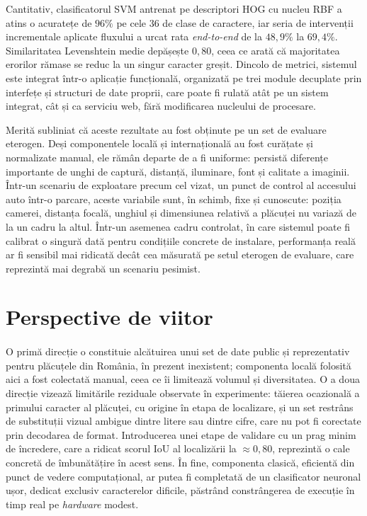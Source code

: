 Cantitativ, clasificatorul SVM antrenat pe descriptori HOG cu nucleu RBF a atins o acuratețe de $96\%$ pe cele $36$ de clase de caractere, iar seria de intervenții incrementale aplicate fluxului a urcat rata \textit{end-to-end} de la $48{,}9\%$ la $69{,}4\%$. Similaritatea Levenshtein medie depășește $0{,}80$, ceea ce arată că majoritatea erorilor rămase se reduc la un singur caracter greșit. Dincolo de metrici, sistemul este integrat într-o aplicație funcțională, organizată pe trei module decuplate prin interfețe și structuri de date proprii, care poate fi rulată atât pe un sistem integrat, cât și ca serviciu web, fără modificarea nucleului de procesare.

Merită subliniat că aceste rezultate au fost obținute pe un set de evaluare eterogen. Deși componentele locală și internațională au fost curățate și normalizate manual, ele rămân departe de a fi uniforme: persistă diferențe importante de unghi de captură, distanță, iluminare, font și calitate a imaginii. Într-un scenariu de exploatare precum cel vizat, un punct de control al accesului auto într-o parcare, aceste variabile sunt, în schimb, fixe și cunoscute: poziția camerei, distanța focală, unghiul și dimensiunea relativă a plăcuței nu variază de la un cadru la altul. Într-un asemenea cadru controlat, în care sistemul poate fi calibrat o singură dată pentru condițiile concrete de instalare, performanța reală ar fi sensibil mai ridicată decât cea măsurată pe setul eterogen de evaluare, care reprezintă mai degrabă un scenariu pesimist.

\section{Perspective de viitor}
\paragraph{}
O primă direcție o constituie alcătuirea unui set de date public și reprezentativ pentru plăcuțele din România, în prezent inexistent; componenta locală folosită aici a fost colectată manual, ceea ce îi limitează volumul și diversitatea. O a doua direcție vizează limitările reziduale observate în experimente: tăierea ocazională a primului caracter al plăcuței, cu origine în etapa de localizare, și un set restrâns de substituții vizual ambigue dintre litere sau dintre cifre, care nu pot fi corectate prin decodarea de format. Introducerea unei etape de validare cu un prag minim de încredere, care a ridicat scorul IoU al localizării la $\approx0{,}80$, reprezintă o cale concretă de îmbunătățire în acest sens. În fine, componenta clasică, eficientă din punct de vedere computațional, ar putea fi completată de un clasificator neuronal ușor, dedicat exclusiv caracterelor dificile, păstrând constrângerea de execuție în timp real pe \textit{hardware} modest.

